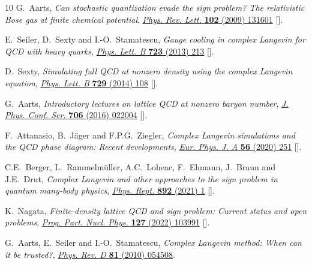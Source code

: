 \begin{thebibliography}{10}
G.~Aarts, \emph{{Can stochastic quantization evade the sign problem? The
  relativistic Bose gas at finite chemical potential}},
  \href{https://doi.org/10.1103/PhysRevLett.102.131601}{\emph{Phys. Rev. Lett.}
  {\bfseries 102} (2009) 131601}
  [\href{https://arxiv.org/abs/0810.2089}{{}}].

E.~Seiler, D.~Sexty and I.-O.~Stamatescu, \emph{{Gauge cooling in complex
  Langevin for QCD with heavy quarks}},
  \href{https://doi.org/10.1016/j.physletb.2013.04.062}{\emph{Phys. Lett. B}
  {\bfseries 723} (2013) 213}
  [\href{https://arxiv.org/abs/1211.3709}{{}}].

D.~Sexty, \emph{{Simulating full QCD at nonzero density using the complex
  Langevin equation}},
  \href{https://doi.org/10.1016/j.physletb.2014.01.019}{\emph{Phys. Lett. B}
  {\bfseries 729} (2014) 108}
  [\href{https://arxiv.org/abs/1307.7748}{{}}].

G.~Aarts, \emph{{Introductory lectures on lattice QCD at nonzero baryon
  number}}, \href{https://doi.org/10.1088/1742-6596/706/2/022004}{\emph{J.
  Phys. Conf. Ser.} {\bfseries 706} (2016) 022004}
  [\href{https://arxiv.org/abs/1512.05145}{{}}].

F.~Attanasio, B.~J\"ager and F.P.G.~Ziegler, \emph{{Complex Langevin
  simulations and the QCD phase diagram: Recent developments}},
  \href{https://doi.org/10.1140/epja/s10050-020-00256-z}{\emph{Eur. Phys. J. A}
  {\bfseries 56} (2020) 251}
  [\href{https://arxiv.org/abs/2006.00476}{{}}].

C.E.~Berger, L.~Rammelm\"uller, A.C.~Loheac, F.~Ehmann, J.~Braun and J.E.~Drut,
  \emph{{Complex Langevin and other approaches to the sign problem in quantum
  many-body physics}},
  \href{https://doi.org/10.1016/j.physrep.2020.09.002}{\emph{Phys. Rept.}
  {\bfseries 892} (2021) 1} [\href{https://arxiv.org/abs/1907.10183}{{}}].

K.~Nagata, \emph{{Finite-density lattice QCD and sign problem: Current status
  and open problems}},
  \href{https://doi.org/10.1016/j.ppnp.2022.103991}{\emph{Prog. Part. Nucl.
  Phys.} {\bfseries 127} (2022) 103991}
  [\href{https://arxiv.org/abs/2108.12423}{{}}].

G.~Aarts, E.~Seiler and I.-O.~Stamatescu, \emph{Complex {{Langevin}} method:
  {{When}} can it be trusted?},
  \href{https://doi.org/10.1103/PhysRevD.81.054508}{\emph{Phys. Rev. D}
  {\bfseries 81} (2010) 054508}.


\end{thebibliography}
